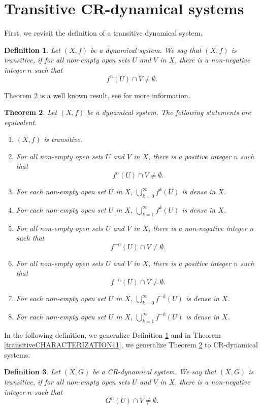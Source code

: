 \documentclass[a4paper,12pt]{article} %
\newtheorem{theorem}{Theorem}[section]
\newtheorem{definition}[theorem]{Definition}
\begin{document}
\section{Transitive CR-dynamical systems}\label{s5}
First, we revisit the definition of a transitive dynamical system. 
\begin{definition}\label{simpl}
Let $(X,f)$ be a dynamical system.  We say that $(X,f)$ is 
 \emph{\color{blue} transitive}, if for all non-empty open sets $U$ and $V$ in $X$,  there is a non-negative integer $n$ such that 
$$
f^n(U)\cap V\neq \emptyset.
$$
\end{definition}
Theorem \ref{jurc} is a well known result, see \cite{B,KS} for more information.
\begin{theorem}\label{jurc}
Let $(X,f)$ be a dynamical system. The following statements are equivalent.
\begin{enumerate}
\item$(X,f)$ is  transitive.
\item For all non-empty open sets $U$ and $V$ in $X$,  there is a positive integer $n$ such that 
$$
f^{n}(U)\cap V\neq \emptyset.
$$
\item  For each non-empty open set $U$ in $X$,  $\bigcup_{k=0}^{\infty}f^{k}(U)$ is dense in $X$.
\item  For each non-empty open set $U$ in $X$,  $\bigcup_{k=1}^{\infty}f^{k}(U)$ is dense in $X$.
\item  For all non-empty open sets $U$ and $V$ in $X$,  there is a non-negative integer $n$ such that 
$$
f^{-n}(U)\cap V\neq \emptyset.
$$
\item For all non-empty open sets $U$ and $V$ in $X$,  there is a positive integer $n$ such that 
$$
f^{-n}(U)\cap V\neq \emptyset.
$$
\item  For each non-empty open set $U$ in $X$,  $\bigcup_{k=0}^{\infty}f^{-k}(U)$ is dense in $X$.
\item  For each non-empty open set $U$ in $X$,  $\bigcup_{k=1}^{\infty}f^{-k}(U)$ is dense in $X$.
\end{enumerate}
\end{theorem}
In the following definition, we  generalize  Definition \ref{simpl} and in Theorem \ref{transitiveCHARACTERIZATION11}, we generalize Theorem \ref{jurc} to CR-dynamical systems.
\begin{definition}
Let $(X,G)$ be a CR-dynamical system.  We say that $(X,G)$ is 
 \emph{\color{blue} transitive}, if for all non-empty open sets $U$ and $V$ in $X$,  there is a non-negative integer $n$ such that 
$$
G^n(U)\cap V\neq \emptyset.
$$
\end{definition}
\end{document}

